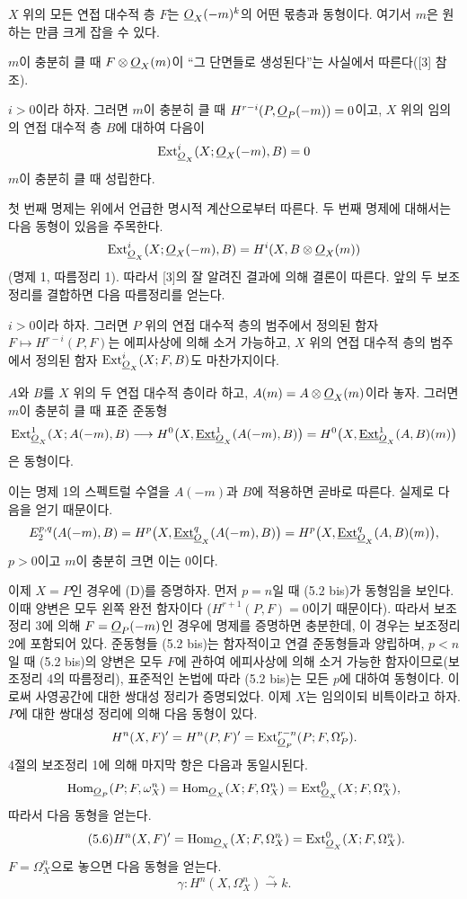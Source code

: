  $X$ 위의 모든 연접 대수적 층 $F$는
$\underline{O}_X(-m)^{k}$의 어떤 몫층과 동형이다. 여기서 $m$은 원하는 만큼
크게 잡을 수 있다.

$m$이 충분히 클 때 $F\otimes\underline{O}_X(m)$이 ``그 단면들로 생성된다''는
사실에서 따른다([3] 참조).

 $i>0$이라 하자. 그러면
$m$이 충분히 클 때 $H^{r-i}(P,\underline{O}_P(-m))=0$이고, $X$ 위의 임의의
연접 대수적 층 $B$에 대하여 다음이
\[
  \operatorname{Ext}_{\underline{O}_X}^{i}(X;\underline{O}_X(-m),B)=0
\]
$m$이 충분히 클 때 성립한다.

첫 번째 명제는 위에서 언급한 명시적 계산으로부터 따른다. 두 번째 명제에
대해서는 다음 동형이 있음을 주목한다.
\[
  \operatorname{Ext}_{\underline{O}_X}^{i}(X;\underline{O}_X(-m),B)
  =H^{i}(X,B\otimes\underline{O}_X(m))
\]
(명제 1, 따름정리 1). 따라서 [3]의 잘 알려진 결과에 의해 결론이
따른다. 앞의 두 보조정리를 결합하면 다음 따름정리를 얻는다.

 $i>0$이라 하자. 그러면 $P$ 위의 연접 대수적 층의
범주에서 정의된 함자 $F\longmapsto H^{r-i}(P,F)$는 에피사상에 의해
소거 가능하고, $X$ 위의 연접 대수적 층의 범주에서 정의된 함자
$\operatorname{Ext}_{\underline{O}_X}^{i}(X;F,B)$도 마찬가지이다.

 $A$와 $B$를 $X$ 위의 두 연접 대수적 층이라 하고,
$A(m)=A\otimes\underline{O}_X(m)$이라 놓자. 그러면 $m$이 충분히 클 때 표준
준동형
\[
  \operatorname{Ext}_{\underline{O}_X}^{1}(X;A(-m),B)
  \longrightarrow H^{0}\bigl(X,\underline{\operatorname{Ext}}_{\underline{O}_X}^{1}(A(-m),B)\bigr)
  =H^{0}\bigl(X,\underline{\operatorname{Ext}}_{\underline{O}_X}^{1}(A,B)(m)\bigr)
\]
은 동형이다.

이는 명제 1의 스펙트럴 수열을 $A(-m)$과 $B$에 적용하면 곧바로 따른다.
실제로 다음을 얻기 때문이다.
\[
  E_{2}^{p,q}(A(-m),B)
  =H^{p}\bigl(X,\underline{\operatorname{Ext}}_{\underline{O}_X}^{q}(A(-m),B)\bigr)
  =H^{p}\bigl(X,\underline{\operatorname{Ext}}_{\underline{O}_X}^{q}(A,B)(m)\bigr),
\]
$p>0$이고 $m$이 충분히 크면 이는 0이다.

이제 $X=P$인 경우에 (D)를 증명하자. 먼저 $p=n$일 때 (5.2 bis)가
동형임을 보인다. 이때 양변은 모두 왼쪽 완전 함자이다
($H^{r+1}(P,F)=0$이기 때문이다). 따라서 보조정리 3에 의해
$F=\underline{O}_P(-m)$인 경우에 명제를 증명하면 충분한데, 이 경우는
보조정리 2에 포함되어 있다. 준동형들 (5.2 bis)는 함자적이고
연결 준동형들과 양립하며, $p<n$일 때 (5.2 bis)의 양변은 모두
$F$에 관하여 에피사상에 의해 소거 가능한 함자이므로(보조정리 4의 따름정리),
표준적인 논법에 따라 (5.2 bis)는 모든 $p$에 대하여 동형이다.
이로써 사영공간에 대한 쌍대성 정리가 증명되었다. 이제 $X$는 임의이되
비특이라고 하자. $P$에 대한 쌍대성 정리에 의해 다음 동형이 있다.
\[
  H^{n}(X,F)'=H^{n}(P,F)'
  =\operatorname{Ext}_{\underline{O}_P}^{r-n}(P;F,\Omega_P^{r}).
\]
4절의 보조정리 1에 의해 마지막 항은 다음과 동일시된다.
\[
  \operatorname{Hom}_{\underline{O}_P}(P;F,\omega_X^{n})
  =\operatorname{Hom}_{\underline{O}_X}(X;F,\Omega_X^{n})
  =\operatorname{Ext}_{\underline{O}_X}^{0}(X;F,\Omega_X^{n}),
\]
따라서 다음 동형을 얻는다.
\begin{equation}\tag{5.6}
  H^{n}(X,F)'=\operatorname{Hom}_{\underline{O}_X}(X;F,\Omega_X^{n})
  =\operatorname{Ext}_{\underline{O}_X}^{0}(X;F,\Omega_X^{n}).
\end{equation}
$F=\Omega_X^{n}$으로 놓으면 다음 동형을 얻는다.
\begin{equation}\tag{5.7}
  \gamma:H^{n}(X,\Omega_X^{n})\xrightarrow{\sim}k.
\end{equation}

